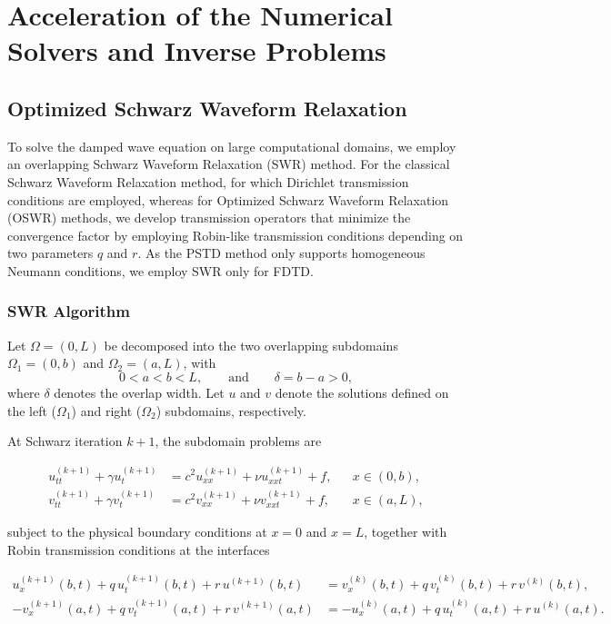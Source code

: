 \documentclass{Configuration_Files/PoliMi3i_thesis}
\begin{document}
\chapter{Acceleration of the Numerical Solvers and Inverse Problems}

\section{Optimized Schwarz Waveform Relaxation}

To solve the damped wave equation on large computational domains, we employ an overlapping Schwarz Waveform Relaxation (SWR) method. For the classical Schwarz Waveform Relaxation method, for which Dirichlet transmission conditions are employed, whereas for Optimized Schwarz Waveform Relaxation (OSWR) methods, we develop transmission operators that minimize the convergence factor by employing Robin-like transmission conditions depending on two parameters $q$ and $r$. As the PSTD method only supports homogeneous Neumann conditions, we employ SWR only for FDTD.

\subsection{SWR Algorithm}
Let $\Omega=(0,L)$ be decomposed into the two overlapping subdomains $\Omega_1=(0,b)$ and $\Omega_2=(a,L)$, with
\[
0<a<b<L,
\qquad \text{and} \qquad
\delta=b-a>0,
\]
where $\delta$ denotes the overlap width. Let $u$ and $v$ denote the solutions defined on the left ($\Omega_1$) and right ($\Omega_2$) subdomains, respectively.

At Schwarz iteration $k+1$, the subdomain problems are

\begin{align*}
u_{tt}^{(k+1)}
+\gamma u_t^{(k+1)}
&=
c^2u_{xx}^{(k+1)}
+\nu u_{xxt}^{(k+1)}
+f,
&&x\in(0,b),
\\
v_{tt}^{(k+1)}
+\gamma v_t^{(k+1)}
&=
c^2v_{xx}^{(k+1)}
+\nu v_{xxt}^{(k+1)}
+f,
&&x\in(a,L),
\end{align*}

subject to the physical boundary conditions at $x=0$ and $x=L$, together with Robin transmission conditions at the interfaces

\begin{align*}
u_x^{(k+1)}(b,t)
+
q\,u_t^{(k+1)}(b,t)
+
r\,u^{(k+1)}(b,t)
&=
v_x^{(k)}(b,t)
+
q\,v_t^{(k)}(b,t)
+
r\,v^{(k)}(b,t),
\\
-v_x^{(k+1)}(a,t)
+
q\,v_t^{(k+1)}(a,t)
+
r\,v^{(k+1)}(a,t)
&=
-u_x^{(k)}(a,t)
+
q\,u_t^{(k)}(a,t)
+
r\,u^{(k)}(a,t).
\end{align*}
\end{document}
